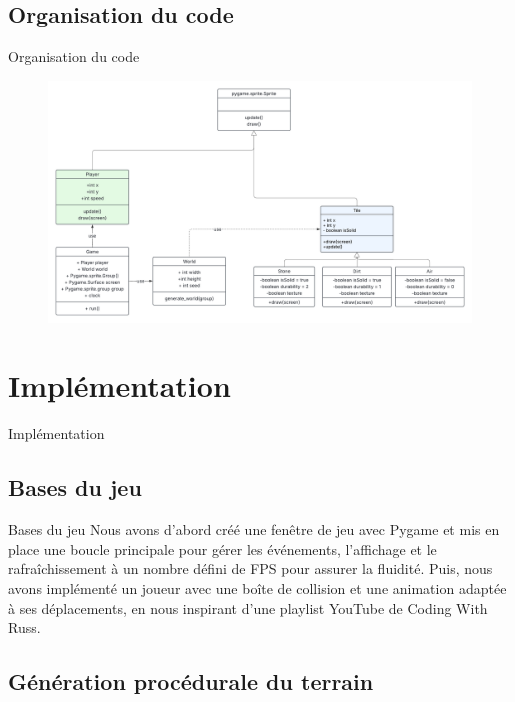 \documentclass[aspectratio=169]{beamer}
\begin{document}
\subsection{Organisation du code}

\begin{frame}{Organisation du code}
    \begin{figure}
        \includegraphics[height=0.8\textheight]{assets/UML_class.png}
    \end{figure}
\end{frame}


\section{Implémentation}

\begin{frame}{Implémentation}
    \tableofcontents[sections={4}]
\end{frame}

\subsection{Bases du jeu}

\begin{frame}{Bases du jeu}
    Nous avons d’abord créé une fenêtre de jeu avec Pygame et mis en place une boucle principale pour gérer les événements, l’affichage et le rafraîchissement à un nombre défini de FPS pour assurer la fluidité. Puis, nous avons implémenté un joueur avec une boîte de collision et une animation adaptée à ses déplacements, en nous inspirant d’une playlist YouTube de Coding With Russ.
\end{frame}

\subsection{Génération procédurale du terrain}
\end{document}
